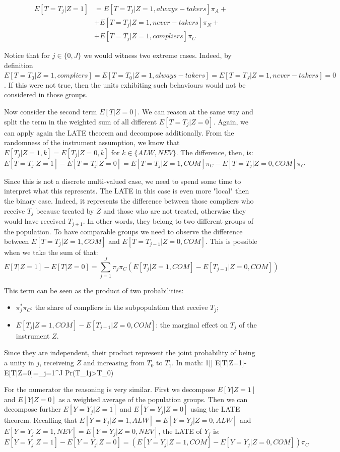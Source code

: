 \documentclass[a4paper,12pt,oneside,English]{article}
\begin{document}
\[
\begin{split}
E[T=T_j|Z=1]&=E[T=T_j|Z=1, always-takers]\pi_A+\\&+E[T=T_j|Z=1, never-takers]\pi_N+\\&+E[T=T_j|Z=1, compliers]\pi_C
\end{split}
\]

Notice that for $j\in\{0,J\}$ we would witness two extreme cases. Indeed, by definition $E[T=T_0|Z=1, compliers]=E[T=T_0|Z=1, always-takers]=E[T=T_J|Z=1, never-takers]=0$. If this were not true, then the units exhibiting such behaviours would not be considered in those groups.

Now consider the second term $E[T|Z=0]$. We can reason at the same way and split the term in the weighted sum of all different $E[T=T_j|Z=0]$. Again, we can apply again the LATE theorem and decompose additionally. From the randomness of the instrument assumption, we know that $E[T_j|Z=1, k]=E[T_j|Z=0, k]$ for $k\in\{ALW,NEV\}$. The difference, then, is:
\[
E[T=T_j|Z=1]-E[T=T_j|Z=0]=E[T=T_j|Z=1, COM]\pi_C-E[T=T_j|Z=0, COM]\pi_C
\]

Since this is not a discrete multi-valued case, we need to spend some time to interpret what this represents. The LATE in this case is even more "local" then the binary case. Indeed, it represents the difference between those compliers who receive $T_j$ because treated by $Z$ and those who are not treated, otherwise they would have received $T_{j+1}$. In other words, they belong to two different groups of the population. To have comparable groups we need to observe the difference between $E[T=T_j|Z=1, COM]$ and $E[T=T_{j-1}|Z=0, COM]$. This is possible when we take the sum of that:
\[
E[T|Z=1]-E[T|Z=0]=\sum_{j=1}^J \pi_j \pi_C(E[T_j|Z=1, COM]-E[T_{j-1}|Z=0, COM])
\]

This term can be seen as the product of two probabilities:
\begin{itemize}
    \item $\pi_j^*\pi_C$: the share of compliers in the subpopulation that receive $T_j$;
    \item $E[T_j|Z=1, COM]-E[T_{j-1}|Z=0, COM]$: the marginal effect on $T_j$ of the instrument $Z$.
\end{itemize}

Since they are independent, their product represent the joint probability of being a unity in $j$, receiveing $Z$ and increasing from $T_0$ to $T_1$. In math:
1[]
E[T|Z=1]-E[T|Z=0]=\sum_{j=1}^J Pr(T_1\geq j>T_0) 
\]

For the numerator the reasoning is very similar. First we decompose $E[Y|Z=1]$ and $E[Y|Z=0]$ as a weighted average of the population groups. Then we can decompose further $E[Y=Y_j|Z=1]$ and $E[Y=Y_j|Z=0]$ using the LATE theorem. Recalling that $E[Y=Y_j|Z=1, ALW]=E[Y=Y_j|Z=0, ALW]$ and $E[Y=Y_j|Z=1, NEV]=E[Y=Y_j|Z=0, NEV]$, the LATE of $Y_j$ is:
\[
E[Y=Y_j|Z=1]-E[Y=Y_j|Z=0]=(E[Y=Y_j|Z=1, COM]-E[Y=Y_j|Z=0, COM])\pi_C
\]
\end{document}
